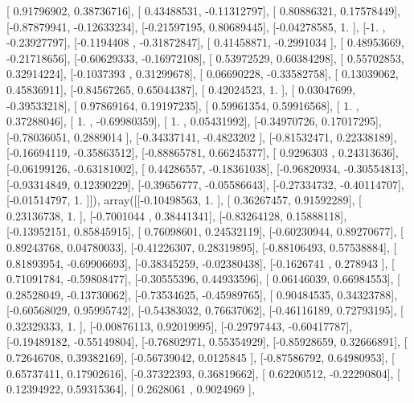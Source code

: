 \documentclass{article}
\begin{document}
       [ 0.91796902,  0.38736716],
       [ 0.43488531, -0.11312797],
       [ 0.80886321,  0.17578449],
       [-0.87879941, -0.12633234],
       [-0.21597195,  0.80689445],
       [-0.04278585,  1.        ],
       [-1.        , -0.23927797],
       [-0.1194408 , -0.31872847],
       [ 0.41458871, -0.2991034 ],
       [ 0.48953669, -0.21718656],
       [-0.60629333, -0.16972108],
       [ 0.53972529,  0.60384298],
       [ 0.55702853,  0.32914224],
       [-0.1037393 ,  0.31299678],
       [ 0.06690228, -0.33582758],
       [ 0.13039062,  0.45836911],
       [-0.84567265,  0.65044387],
       [ 0.42024523,  1.        ],
       [ 0.03047699, -0.39533218],
       [ 0.97869164,  0.19197235],
       [ 0.59961354,  0.59916568],
       [ 1.        ,  0.37288046],
       [ 1.        , -0.69980359],
       [ 1.        ,  0.05431992],
       [-0.34970726,  0.17017295],
       [-0.78036051,  0.2889014 ],
       [-0.34337141, -0.4823202 ],
       [-0.81532471,  0.22338189],
       [-0.16694119, -0.35863512],
       [-0.88865781,  0.66245377],
       [ 0.9296303 ,  0.24313636],
       [-0.06199126, -0.63181002],
       [ 0.44286557, -0.18361038],
       [-0.96820934, -0.30554813],
       [-0.93314849,  0.12390229],
       [-0.39656777, -0.05586643],
       [-0.27334732, -0.40114707],
       [-0.01514797,  1.        ]]), array([[-0.10498563,  1.        ],
       [ 0.36267457,  0.91592289],
       [ 0.23136738,  1.        ],
       [-0.7001044 ,  0.38441341],
       [-0.83264128,  0.15888118],
       [-0.13952151,  0.85845915],
       [ 0.76098601,  0.24532119],
       [-0.60230944,  0.89270677],
       [ 0.89243768,  0.04780033],
       [-0.41226307,  0.28319895],
       [-0.88106493,  0.57538884],
       [ 0.81893954, -0.69906693],
       [-0.38345259, -0.02380438],
       [-0.1626741 ,  0.278943  ],
       [ 0.71091784, -0.59808477],
       [-0.30555396,  0.44933596],
       [ 0.06146039,  0.66984553],
       [ 0.28528049, -0.13730062],
       [-0.73534625, -0.45989765],
       [ 0.90484535,  0.34323788],
       [-0.60568029,  0.95995742],
       [-0.54383032,  0.76637062],
       [-0.46116189,  0.72793195],
       [ 0.32329333,  1.        ],
       [-0.00876113,  0.92019995],
       [-0.29797443, -0.60417787],
       [-0.19489182, -0.55149804],
       [-0.76802971,  0.55354929],
       [-0.85928659,  0.32666891],
       [ 0.72646708,  0.39382169],
       [-0.56739042,  0.0125845 ],
       [-0.87586792,  0.64980953],
       [ 0.65737411,  0.17902616],
       [-0.37322393,  0.36819662],
       [ 0.62200512, -0.22290804],
       [ 0.12394922,  0.59315364],
       [ 0.2628061 ,  0.9024969 ],
\end{document}
